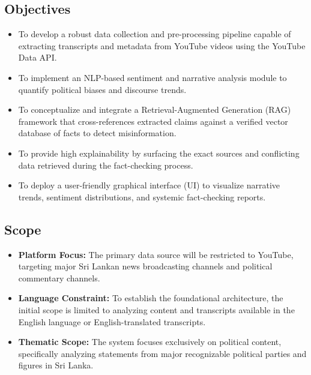 \documentclass[12pt,a4paper]{report}
\begin{document}
\subsection{Objectives}
\begin{itemize}
    \item To develop a robust data collection and pre-processing pipeline capable of extracting transcripts and metadata from YouTube videos using the YouTube Data API.
    \item To implement an NLP-based sentiment and narrative analysis module to quantify political biases and discourse trends.
    \item To conceptualize and integrate a Retrieval-Augmented Generation (RAG) framework that cross-references extracted claims against a verified vector database of facts to detect misinformation.
    \item To provide high explainability by surfacing the exact sources and conflicting data retrieved during the fact-checking process.
    \item To deploy a user-friendly graphical interface (UI) to visualize narrative trends, sentiment distributions, and systemic fact-checking reports.
\end{itemize}

\subsection{Scope}
\begin{itemize}
    \item \textbf{Platform Focus:} The primary data source will be restricted to YouTube, targeting major Sri Lankan news broadcasting channels and political commentary channels.
    \item \textbf{Language Constraint:} To establish the foundational architecture, the initial scope is limited to analyzing content and transcripts available in the English language or English-translated transcripts.
    \item \textbf{Thematic Scope:} The system focuses exclusively on political content, specifically analyzing statements from major recognizable political parties and figures in Sri Lanka.
\end{itemize}
\end{document}
